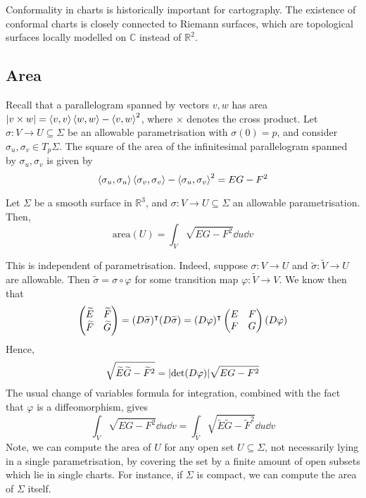 \begin{remark}
	Conformality in charts is historically important for cartography.
	The existence of conformal charts is closely connected to Riemann surfaces, which are topological surfaces locally modelled on \( \mathbb C \) instead of \( \mathbb R^2 \).
\end{remark}

\subsection{Area}
Recall that a parallelogram spanned by vectors \( v, w \) has area \( \abs{v \times w} = \left\langle{v,v}\right\rangle\left\langle{w,w}\right\rangle - \left\langle{v,w}\right\rangle^2 \), where \( \times \) denotes the cross product.
Let \( \sigma \colon V \to U \subseteq \Sigma \) be an allowable parametrisation with \( \sigma(0) = p \), and consider \( \sigma_u, \sigma_v \in T_p \Sigma \).
The square of the area of the infinitesimal parallelogram spanned by \( \sigma_u, \sigma_v \) is given by
\[ \left\langle{\sigma_u, \sigma_u}\right\rangle\left\langle{\sigma_v, \sigma_v}\right\rangle - \left\langle{\sigma_u, \sigma_v}\right\rangle^2 = EG - F^2 \]
\begin{definition}
	Let \( \Sigma \) be a smooth surface in \( \mathbb R^3 \), and \( \sigma \colon V \to U \subseteq \Sigma \) an allowable parametrisation.
	Then,
	\[ \mathrm{area}(U) = \int_V \sqrt{EG - F^2} \dd{u}\dd{v} \]
\end{definition}
\begin{remark}
	This is independent of parametrisation.
	Indeed, suppose \( \sigma \colon V \to U \) and \( \widetilde \sigma \colon \widetilde V \to U \) are allowable.
	Then \( \widetilde \sigma = \sigma \circ \varphi \) for some transition map \( \varphi \colon \widetilde V \to V \).
	We know then that
	\[ \begin{pmatrix}
		\widetilde E & \widetilde F \\
		\widetilde F & \widetilde G
	\end{pmatrix} = (D\widetilde \sigma)^\intercal (D\widetilde \sigma) = (D\varphi)^\intercal \begin{pmatrix}
		E & F \\
		F & G
	\end{pmatrix} (D\varphi) \]
	Hence,
	\[ \sqrt{\widetilde E \widetilde G - \widetilde F^2} = \abs{\det(D\varphi)} \sqrt{EG - F^2} \]
	The usual change of variables formula for integration, combined with the fact that \( \varphi \) is a diffeomorphism, gives
	\[ \int_V \sqrt{EG - F^2} \dd{u}\dd{v} = \int_{\widetilde V} \sqrt{\widetilde E \widetilde G - \widetilde F^2} \dd{u}\dd{v} \]
	Note, we can compute the area of \( U \) for any open set \( U \subseteq \Sigma \), not necessarily lying in a single parametrisation, by covering the set by a finite amount of open subsets which lie in single charts.
	For instance, if \( \Sigma \) is compact, we can compute the area of \( \Sigma \) itself.
\end{remark}
